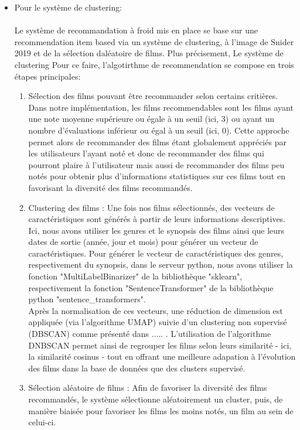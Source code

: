 \documentclass{article}
\begin{document}
\begin{itemize}
    \item Pour le système de clustering:\\
          $ $\\
          Le système de recommandation à froid mis en place se base sur une recommendation item based via un système de clustering, à l'image de Snider 2019 \cite{snider_unsupervised} et de la sélection daléatoire de films.
          Plus précisement, Le système de clustering
          Pour ce faire, l'algotirthme de recommendation se compose en trois étapes principales:\\
          \begin{enumerate}
              \item Sélection des films pouvant être recommander selon certains critières. Dans notre implémentation, les films recommendables sont les films ayant une note moyenne supérieure ou égale à un seuil (ici, 3) ou
                    ayant un nombre d’évaluations inférieur ou égal à un seuil (ici, 0). Cette approche permet alors de recommander des films étant globalement appréciés par les utilisateurs l'ayant noté et donc de recommander des films qui
                    pourront plaire à l'utilisateur mais aussi de recommander des films peu notés pour obtenir plus d'informations statistiques sur ces films tout en favorisant la diversité des films recommandés.
              \item Clustering des films : Une fois nos films sélectionnés, des vecteurs de caractéristiques sont générés à partir de leurs informations descriptives. Ici, nous avons utiliser les genres et le synopsis des films ainsi que leurs dates de
                    sortie (année, jour et mois) pour générer un vecteur de caractéristiques. Pour générer le vecteur de caractéristiques des genres, respectivement du synopsis, dans le serveur python, nous avons utiliser la fonction "MultiLabelBinarizer" de
                    la bibliothèque "sklearn", respectivement la fonction "SentenceTransformer" de la bibliothèque python "sentence\_transformers".\\
                    Après la normalisation de ces vecteurs, une réduction de dimension est appliquée (via l’algorithme UMAP) suivie d’un clustering non supervisé (DBSCAN) comme présenté dans ..... . L'utilisation de l'algorithme DNBSCAN permet ainsi de regrouper
                    les films selon leurs similarité - ici, la similarité cosinus - tout en offrant une meilleure adapation à l'évolution des films dans la base de données que des clusters supervisé.
              \item Sélection aléatoire de films : Afin de favoriser la diversité des films recommandés, le système sélectionne aléatoirement un cluster, puis, de manière biaisée pour favoriser les films les moins notés, un film au sein de celui-ci.

\end{enumerate}
\end{itemize}
\end{document}
